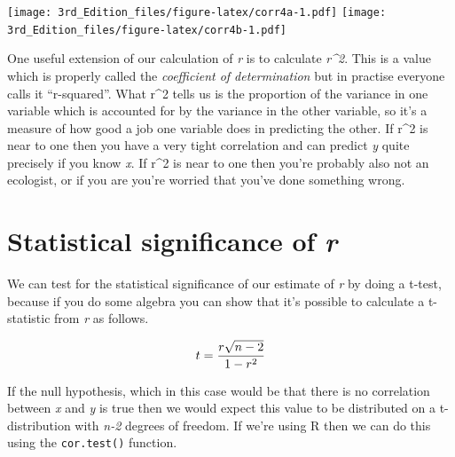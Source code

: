 \documentclass[
]{book}
\newenvironment{Shaded}{\begin{snugshade}}{\end{snugshade}}
\newcommand{\KeywordTok}[1]{\textcolor[rgb]{0.13,0.29,0.53}{\textbf{#1}}}
\newcommand{\NormalTok}[1]{#1}
\newcommand{\OperatorTok}[1]{\textcolor[rgb]{0.81,0.36,0.00}{\textbf{#1}}}
\newcommand{\StringTok}[1]{\textcolor[rgb]{0.31,0.60,0.02}{#1}}
\begin{document}
\texttt{[image: 3rd\_Edition\_files/figure-latex/corr4a-1.pdf]}
\texttt{[image: 3rd\_Edition\_files/figure-latex/corr4b-1.pdf]}

One useful extension of our calculation of \emph{r} is to calculate \emph{r\^{}2}. This is a value which is properly called the \emph{coefficient of determination} but in practise everyone calls it ``r-squared''. What r\^{}2 tells us is the proportion of the variance in one variable which is accounted for by the variance in the other variable, so it's a measure of how good a job one variable does in predicting the other. If r\^{}2 is near to one then you have a very tight correlation and can predict \emph{y} quite precisely if you know \emph{x}. If r\^{}2 is near to one then you're probably also not an ecologist, or if you are you're worried that you've done something wrong.

\hypertarget{statistical-significance-of-r}{%
\section{\texorpdfstring{Statistical significance of \emph{r}}{Statistical significance of r}}\label{statistical-significance-of-r}}

We can test for the statistical significance of our estimate of \emph{r} by doing a t-test, because if you do some algebra you can show that it's possible to calculate a t-statistic from \emph{r} as follows.

\[\Large t = \frac{r \sqrt{n-2}}{1-r^2}\]

If the null hypothesis, which in this case would be that there is no correlation between \emph{x} and \emph{y} is true then we would expect this value to be distributed on a t-distribution with \emph{n-2} degrees of freedom. If we're using R then we can do this using the \texttt{cor.test()} function.

\begin{Shaded}
\end{Shaded}
\end{document}
